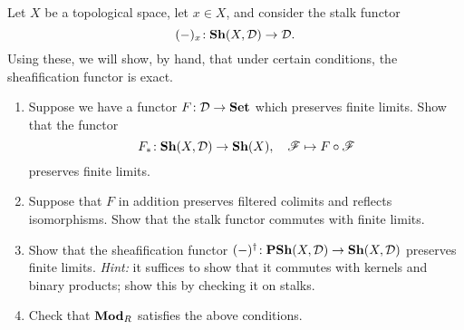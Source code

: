 \begin{exercise}
	Let \(X\) be a topological space, let \(x\in X\), and consider the stalk functor
	\[ (-)_x\!:\operatorname{\mathbf{Sh}}(X,\mathcal{D})\to\mathcal{D}. \]
	Using these, we will show, by hand, that under certain conditions, the sheafification functor is exact.
	\begin{enumerate}[label=(\arabic*)]
	\item Suppose we have a functor \(F\!:\mathcal{D}\to\mathbf{Set}\) which preserves finite limits. Show that the functor
	\[ F_*\!:\operatorname{\mathbf{Sh}}(X,\mathcal{D})\to\operatorname{\mathbf{Sh}}(X),\quad \mathscr{F}\mapsto F\circ\mathscr{F} \]
	preserves finite limits.
	\item Suppose that \(F\) in addition preserves filtered colimits and reflects isomorphisms. Show that the stalk functor commutes with finite limits.
	\item Show that the sheafification functor \((-)^\dagger\!:\operatorname{\mathbf{PSh}}(X,\mathcal{D})\to\operatorname{\mathbf{Sh}}(X,\mathcal{D})\) preserves finite limits. \emph{Hint:} it suffices to show
	that it commutes with kernels and binary products; show this by checking it on stalks.
	\item Check that \(\mathbf{Mod}_R\) satisfies the above conditions.
	\end{enumerate}
\end{exercise}


